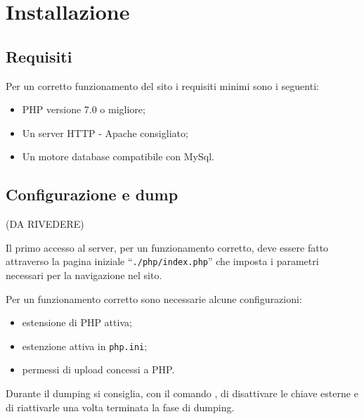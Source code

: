 \section{Installazione}
	\subsection{Requisiti}
	\par Per un corretto funzionamento del sito i requisiti minimi sono i seguenti:
	\begin{itemize}
		\item PHP versione 7.0 o migliore;
		\item Un server HTTP - Apache consigliato;
		\item Un motore database compatibile con MySql.
	\end{itemize}
	\subsection{Configurazione e dump}
	\par (DA RIVEDERE)
	\par Il primo accesso al server, per un funzionamento corretto, deve essere fatto attraverso la pagina iniziale “\texttt{./php/index.php}” che imposta i parametri necessari per la navigazione nel sito. \acapo
	\par Per un funzionamento corretto sono necessarie alcune configurazioni:
	\begin{itemize}
		\item estensione  di PHP attiva;
		\item estenzione  attiva in \texttt{php.ini};
		\item permessi di upload concessi a PHP.
	\end{itemize}
	\par Durante il dumping si consiglia, con il comando , di disattivare le chiave esterne e di riattivarle una volta terminata la fase di dumping.
	